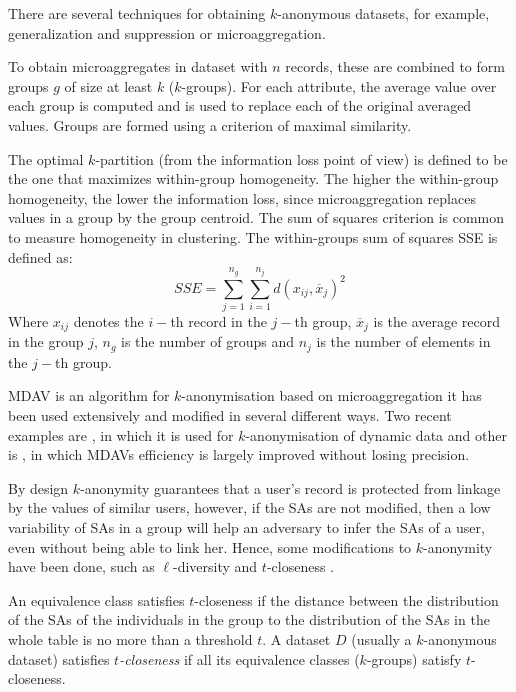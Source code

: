 There are several techniques for obtaining $k$-anonymous datasets, for example, generalization and suppression or microaggregation.

\begin{definition}[Microaggregation]
To obtain microaggregates in dataset with $n$ records, these are combined to form groups $g$ of size at least $k$ ($k$-groups). For each attribute, the average value over each group is computed and is used to replace each of the original averaged values. Groups are formed using a criterion of maximal similarity.
\end{definition}

The optimal $k$-partition (from the information loss point of view) is defined to be the one that maximizes within-group homogeneity. The higher the within-group homogeneity, the lower the information loss, since microaggregation replaces values in a group by the group centroid. The sum of squares criterion is common to measure homogeneity in clustering. The within-groups sum of squares SSE is defined as:
$$SSE= \displaystyle\sum_{j=1}^{n_g}\sum_{i=1}^{n_j}d(x_{ij},\overline{x}_j)^2$$
Where $x_{ij}$ denotes the $i-$th record in the $j-$th group, $\overline{x}_j$ is the average record in the group $j$, $n_g$ is the number of groups and $n_j$ is the number of elements in the $j-$th group.

MDAV \cite{Domingo:2005} is an algorithm for $k$-anonymisation based on microaggregation it has been used extensively and modified in several different ways. Two recent examples are \cite{Salas:2018-b}, in which it is used for $k$-anonymisation of dynamic data and other is \cite{Rodriguez:2020}, in which MDAVs efficiency is largely improved without losing precision. 

By design $k$-anonymity guarantees that a user's record is protected from linkage by the values of similar users, however, if the SAs are not modified, then a low variability of SAs in a group will help an adversary to infer the SAs of a user, even without being able to link her. 
Hence, some modifications to $k$-anonymity have been done, such as $\ell$-diversity \cite{Machanavajjhala:2006} and $t$-closeness \cite{Li:2007}. 

\begin{definition}[$t$-Closeness]
An equivalence class satisfies $t$-closeness if the distance between the distribution of the SAs of the individuals in the group to the distribution of the SAs in the whole table is no more than a threshold $t$.
A dataset $D$ (usually a $k$-anonymous dataset) satisfies \emph{$t$-closeness} if all its equivalence classes ($k$-groups) satisfy $t$-closeness.
\end{definition}
